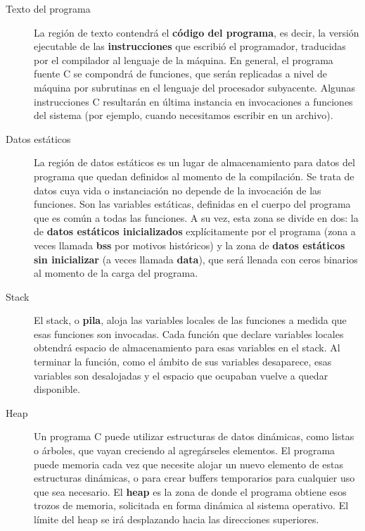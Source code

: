 \begin{description}
	\item[Texto del programa] La región de texto contendrá el \textbf{código del programa}, es decir, la versión ejecutable de las
\textbf{instrucciones} que escribió el programador, traducidas por el compilador al lenguaje de la máquina. En
general, el programa fuente C se compondrá de funciones, que serán replicadas a nivel de máquina por
subrutinas en el lenguaje del procesador subyacente. Algunas instrucciones C resultarán en última
instancia en invocaciones a funciones del sistema (por ejemplo, cuando necesitamos escribir en un
archivo).
	\item[Datos estáticos] La región de datos estáticos es un lugar de almacenamiento para datos del programa que quedan
definidos al momento de la compilación. Se trata de datos cuya vida o instanciación no depende de la
invocación de las funciones. Son las variables estáticas, definidas en el cuerpo del programa que es
común a todas las funciones. A su vez, esta zona se divide en dos: la de \textbf{datos estáticos inicializados}
explícitamente por el programa (zona a veces llamada \textbf{bss} por motivos históricos) y la zona de \textbf{datos
estáticos sin inicializar} (a veces llamada \textbf{data}), que será llenada con ceros binarios al momento de la
carga del programa.
	\item[Stack] El stack, o \textbf{pila}, aloja las variables locales de las funciones a medida que esas funciones son invocadas. Cada función que declare variables locales obtendrá espacio de almacenamiento para esas variables en el stack. Al terminar la función, como el ámbito de sus variables desaparece, esas variables son desalojadas y el espacio que ocupaban vuelve a quedar disponible. 
	\item[Heap] Un programa C puede utilizar estructuras de datos dinámicas, como listas o árboles, que vayan
creciendo al agregárseles elementos. El programa puede  memoria cada vez que necesite alojar
un nuevo elemento de estas estructuras dinámicas, o para crear buffers temporarios para cualquier uso
que sea necesario. El \textbf{heap} es la zona de donde el programa obtiene esos trozos de memoria, solicitada en forma dinámica al sistema operativo. El límite del heap se irá desplazando hacia las direcciones superiores.

\end{description}

